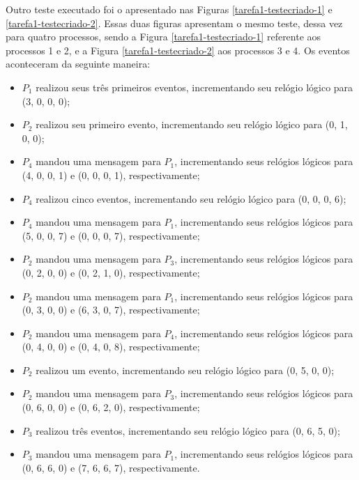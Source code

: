 \documentclass[conference]{IEEEtran}
\begin{document}

	Outro teste executado foi o apresentado nas Figuras \ref{tarefa1-testecriado-1} e \ref{tarefa1-testecriado-2}. Essas duas figuras apresentam o mesmo teste, dessa vez para quatro processos, sendo a Figura \ref{tarefa1-testecriado-1} referente aos processos 1 e 2, e a Figura \ref{tarefa1-testecriado-2} aos processos 3 e 4. Os eventos aconteceram da seguinte maneira:
	
\begin{itemize}
\item $P_1$ realizou seus três primeiros eventos, incrementando seu relógio lógico para (3, 0, 0, 0);
\item $P_2$ realizou seu primeiro evento, incrementando seu relógio lógico para (0, 1, 0, 0);
\item $P_4$ mandou uma mensagem para $P_1$, incrementando seus relógios lógicos para (4, 0, 0, 1) e (0, 0, 0, 1), respectivamente;
\item $P_4$ realizou cinco eventos, incrementando seu relógio lógico para (0, 0, 0, 6);
\item $P_4$ mandou uma mensagem para $P_1$, incrementando seus relógios lógicos para (5, 0, 0, 7) e (0, 0, 0, 7), respectivamente;
\item $P_2$ mandou uma mensagem para $P_3$, incrementando seus relógios lógicos para (0, 2, 0, 0) e (0, 2, 1, 0), respectivamente;
\item $P_2$ mandou uma mensagem para $P_1$, incrementando seus relógios lógicos para (0, 3, 0, 0) e (6, 3, 0, 7), respectivamente;
\item $P_2$ mandou uma mensagem para $P_4$, incrementando seus relógios lógicos para (0, 4, 0, 0) e (0, 4, 0, 8), respectivamente;
\item $P_2$ realizou um evento, incrementando seu relógio lógico para (0, 5, 0, 0);
\item $P_2$ mandou uma mensagem para $P_3$, incrementando seus relógios lógicos para (0, 6, 0, 0) e (0, 6, 2, 0), respectivamente;
\item $P_3$ realizou três eventos, incrementando seu relógio lógico para (0, 6, 5, 0);
\item $P_3$ mandou uma mensagem para $P_1$, incrementando seus relógios lógicos para (0, 6, 6, 0) e (7, 6, 6, 7), respectivamente.
\end{itemize}
\end{document}
